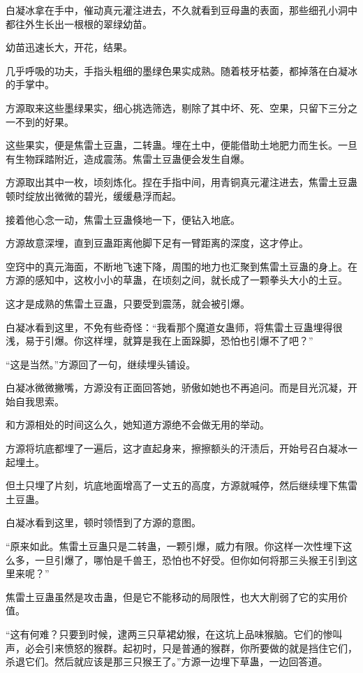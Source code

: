 \begin{this_body}
白凝冰拿在手中，催动真元灌注进去，不久就看到豆母蛊的表面，那些细孔小洞中都往外生长出一根根的翠绿幼苗。

幼苗迅速长大，开花，结果。

几乎呼吸的功夫，手指头粗细的墨绿色果实成熟。随着枝牙枯萎，都掉落在白凝冰的手掌中。

方源取来这些墨绿果实，细心挑选筛选，剔除了其中坏、死、空果，只留下三分之一不到的好果。

这些果实，便是焦雷土豆蛊，二转蛊。埋在土中，便能借助土地肥力而生长。一旦有生物踩踏附近，造成震荡。焦雷土豆蛊便会发生自爆。

方源取出其中一枚，顷刻炼化。捏在手指中间，用青铜真元灌注进去，焦雷土豆蛊顿时绽放出微微的碧光，缓缓悬浮而起。

接着他心念一动，焦雷土豆蛊倏地一下，便钻入地底。

方源故意深埋，直到豆蛊距离他脚下足有一臂距离的深度，这才停止。

空窍中的真元海面，不断地飞速下降，周围的地力也汇聚到焦雷土豆蛊的身上。在方源的感知中，这枚小小的草蛊，在顷刻之间，就长成了一颗拳头大小的土豆。

这才是成熟的焦雷土豆蛊，只要受到震荡，就会被引爆。

白凝冰看到这里，不免有些奇怪：“我看那个魔道女蛊师，将焦雷土豆蛊埋得很浅，易于引爆。你这样埋，就算是我在上面跺脚，恐怕也引爆不了吧？”

“这是当然。”方源回了一句，继续埋头铺设。

白凝冰微微撇嘴，方源没有正面回答她，骄傲如她也不再追问。而是目光沉凝，开始自我思索。

和方源相处的时间这么久，她知道方源绝不会做无用的举动。

方源将坑底都埋了一遍后，这才直起身来，擦擦额头的汗渍后，开始号召白凝冰一起埋土。

但土只埋了片刻，坑底地面增高了一丈五的高度，方源就喊停，然后继续埋下焦雷土豆蛊。

白凝冰看到这里，顿时领悟到了方源的意图。

“原来如此。焦雷土豆蛊只是二转蛊，一颗引爆，威力有限。你这样一次性埋下这么多，一旦引爆了，哪怕是千兽王，恐怕也不好受。但你如何将那三头猴王引到这里来呢？”

焦雷土豆蛊虽然是攻击蛊，但是它不能移动的局限性，也大大削弱了它的实用价值。

“这有何难？只要到时候，逮两三只草裙幼猴，在这坑上品味猴脑。它们的惨叫声，必会引来愤怒的猴群。起初时，只是普通的猴群，你所要做的就是挡住它们，杀退它们。然后就应该是那三只猴王了。”方源一边埋下草蛊，一边回答道。


\end{this_body}
